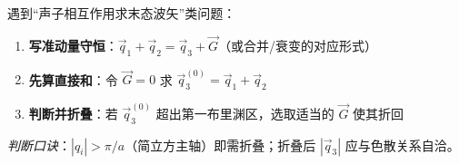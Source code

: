 \begin{thinkbox}
遇到``声子相互作用求末态波矢''类问题：
\begin{enumerate}
    \item \textbf{写准动量守恒}：$\vec q_1+\vec q_2=\vec q_3+\vec G$（或合并/衰变的对应形式）
    \item \textbf{先算直接和}：令 $\vec G=0$ 求 $\vec q_3^{(0)}=\vec q_1+\vec q_2$
    \item \textbf{判断并折叠}：若 $\vec q_3^{(0)}$ 超出第一布里渊区，选取适当的 $\vec G$ 使其折回
\end{enumerate}
\textit{判断口诀}：$|q_i|>\pi/a$（简立方主轴）即需折叠；折叠后 $|\vec q_3|$ 应与色散关系自洽。
\end{thinkbox}
